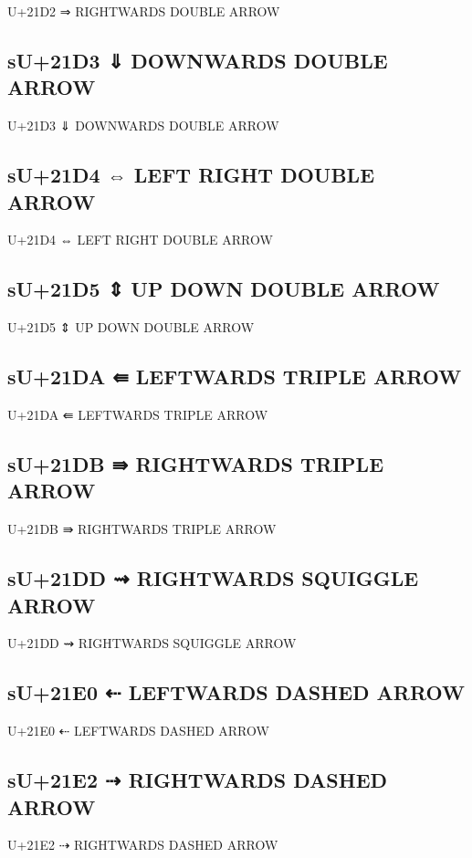 U+21D2 ⇒ RIGHTWARDS DOUBLE ARROW

\subsection{sU+21D3 ⇓ DOWNWARDS DOUBLE ARROW}

U+21D3 ⇓ DOWNWARDS DOUBLE ARROW

\subsection{sU+21D4 ⇔ LEFT RIGHT DOUBLE ARROW}

U+21D4 ⇔ LEFT RIGHT DOUBLE ARROW

\subsection{sU+21D5 ⇕ UP DOWN DOUBLE ARROW}

U+21D5 ⇕ UP DOWN DOUBLE ARROW

\subsection{sU+21DA ⇚ LEFTWARDS TRIPLE ARROW}

U+21DA ⇚ LEFTWARDS TRIPLE ARROW

\subsection{sU+21DB ⇛ RIGHTWARDS TRIPLE ARROW}

U+21DB ⇛ RIGHTWARDS TRIPLE ARROW

\subsection{sU+21DD ⇝ RIGHTWARDS SQUIGGLE ARROW}

U+21DD ⇝ RIGHTWARDS SQUIGGLE ARROW

\subsection{sU+21E0 ⇠ LEFTWARDS DASHED ARROW}

U+21E0 ⇠ LEFTWARDS DASHED ARROW

\subsection{sU+21E2 ⇢ RIGHTWARDS DASHED ARROW}

U+21E2 ⇢ RIGHTWARDS DASHED ARROW

